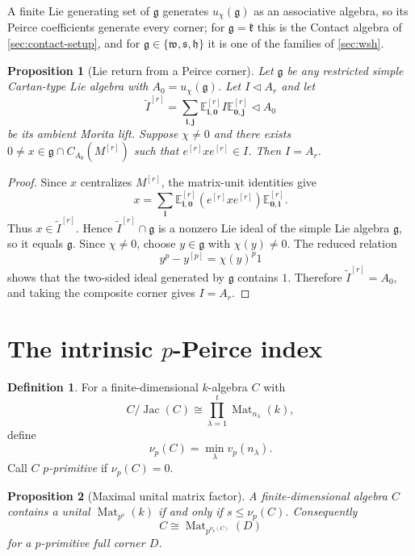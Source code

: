 \documentclass[11pt,reqno]{amsart}
\newtheorem{proposition}[proposition]{Proposition}
\theoremstyle{definition}
\newtheorem{definition}[definition]{Definition}
\theoremstyle{remark}
\theoremstyle{definition}
\newcommand{\kk}{\mathfrak{k}}
\newcommand{\Mat}{\operatorname{Mat}}
\newcommand{\Jac}{\operatorname{Jac}}
\newcommand{\vp}{v_p}
\newcommand{\nuP}{\nu_p}
\begin{document}
A finite Lie generating set of $\mathfrak g$ generates $u_\chi(\mathfrak g)$
as an associative algebra, so its Peirce coefficients generate every corner; for $\mathfrak g=\kk$ this is the Contact
algebra of \cref{sec:contact-setup}, and for $\mathfrak
g\in\{\mathfrak w,\mathfrak s,\mathfrak h\}$ it is one of the families of
\cref{sec:wsh}.

\begin{proposition}[Lie return from a Peirce corner]\label{prop:lie-return}
Let $\mathfrak g$ be any restricted simple Cartan-type Lie algebra with
$A_0=u_\chi(\mathfrak g)$.  Let $I\triangleleft A_r$ and let
\[
 \widetilde I^{[r]}
 =\sum_{\mathbf i,\mathbf j}
 \mathbb E^{[r]}_{\mathbf i,\mathbf0}
 I
 \mathbb E^{[r]}_{\mathbf0,\mathbf j}
 \triangleleft A_0
\]
be its ambient Morita lift.  Suppose $\chi\ne0$ and there exists
$0\ne x\in\mathfrak g\cap C_{A_0}(M^{[r]})$ such that
$e^{[r]}xe^{[r]}\in I$.  Then $I=A_r$.
\end{proposition}

\begin{proof}
Since $x$ centralizes $M^{[r]}$, the matrix-unit identities give
\[
 x=\sum_{\mathbf i}
 \mathbb E^{[r]}_{\mathbf i,\mathbf0}
 (e^{[r]}xe^{[r]})
 \mathbb E^{[r]}_{\mathbf0,\mathbf i}.
\]
Thus $x\in\widetilde I^{[r]}$.
Hence $\widetilde I^{[r]}\cap\mathfrak g$ is a nonzero Lie ideal of the
simple Lie algebra $\mathfrak g$, so it equals $\mathfrak g$.  Since $\chi\ne0$, choose
$y\in\mathfrak g$ with $\chi(y)\ne0$.  The reduced relation
\[
 y^p-y^{[p]}=\chi(y)^p1
\]
shows that the two-sided ideal generated by $\mathfrak g$ contains $1$.
Therefore $\widetilde I^{[r]}=A_0$, and taking the composite corner gives
$I=A_r$.
\end{proof}

\section{The intrinsic \texorpdfstring{$p$}{p}-Peirce index}\label{sec:index}

\begin{definition}
For a finite-dimensional $k$-algebra $C$ with
\[
 C/\Jac(C)\cong\prod_{\lambda=1}^t\Mat_{n_\lambda}(k),
\]
define
\[
 \nuP(C)=\min_\lambda\vp(n_\lambda).
\]
Call $C$ \emph{$p$-primitive} if $\nuP(C)=0$.
\end{definition}

\begin{proposition}[Maximal unital matrix factor]\label{prop:max-factor}
A finite-dimensional algebra $C$ contains a unital
$\Mat_{p^s}(k)$ if and only if $s\le\nuP(C)$.  Consequently
\[
 C\cong\Mat_{p^{\nuP(C)}}(D)
\]
for a $p$-primitive full corner $D$.
\end{proposition}
\end{document}
